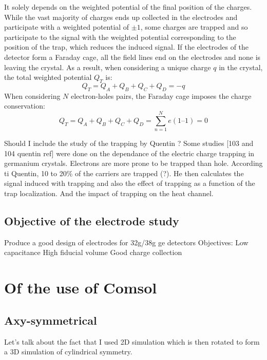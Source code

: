 It solely depends on the weighted potential of the final position of the charges. While the vast majority of charges ends up collected in the electrodes and participate with a weighted potential of $\pm 1$, some charges are trapped and so participate to the signal with the weighted potential corresponding to the position of the trap, which reduces the induced signal.
If the electrodes of the detector form a Faraday cage, all the field lines end on the electrodes and none is leaving the crystal. As a result, when considering a unique charge $q$ in the crystal, the total weighted potential $Q_T$ is:
\begin{equation}
\label{eq:charge-conservation}
Q_T = Q_A + Q_B + Q_C + Q_D = -q
\end{equation}
When considering $N$ electron-holes pairs, the Faraday cage imposes the charge conservation:
\begin{equation}
\label{eq:charge-conservation}
Q_T = Q_A + Q_B + Q_C + Q_D = \sum_{n=1}^{N} e (1 – 1) = 0
\end{equation}

Should I include the study of the trapping by Quentin ? Some studies [103 and 104 quentin ref] were done on the dependance of the electric charge  trapping in germanium crystals. Electrons are more prone to be trapped than hole. According ti Quentin, 10 to 20\% of the carriers are trapped (?). He then calculates the signal induced with trapping and also the effect of trapping as a function of the trap localization. And the impact of trapping on the heat channel.



\subsection{Objective of the electrode study}

Produce a good design of electrodes for 32g/38g ge detectors
Objectives:
Low capacitance
High fiducial volume
Good charge collection


\section{Of the use of Comsol}

\subsection{Axy-symmetrical} 

Let's talk about the fact that I used 2D simulation which is then rotated to form a 3D simulation of cylindrical symmetry.

